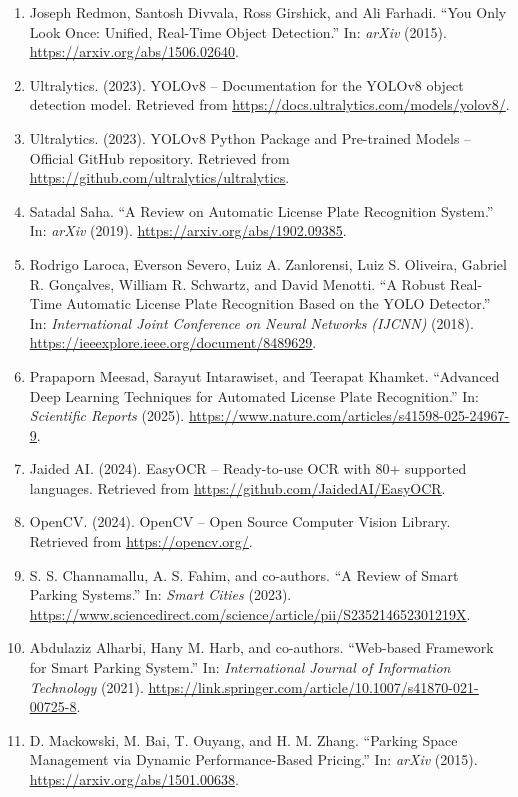 \documentclass[12pt,a4paper,oneside]{report}
\renewcommand{\url}[1]{\href{#1}{\textcolor{linkblue}{\uline{#1}}}}
\begin{document}
\begin{enumerate}[leftmargin=1.9em,label=\arabic*.,labelsep=0.45em,itemsep=0.15em,topsep=0.1em,parsep=0pt,partopsep=0pt]
    \item Joseph Redmon, Santosh Divvala, Ross Girshick, and Ali Farhadi. ``You Only Look Once: Unified, Real-Time Object Detection.'' In: \emph{arXiv} (2015). \url{https://arxiv.org/abs/1506.02640}.
    \item Ultralytics. (2023). YOLOv8 -- Documentation for the YOLOv8 object detection model. Retrieved from \url{https://docs.ultralytics.com/models/yolov8/}.
    \item Ultralytics. (2023). YOLOv8 Python Package and Pre-trained Models -- Official GitHub repository. Retrieved from \url{https://github.com/ultralytics/ultralytics}.
    \item Satadal Saha. ``A Review on Automatic License Plate Recognition System.'' In: \emph{arXiv} (2019). \url{https://arxiv.org/abs/1902.09385}.
    \item Rodrigo Laroca, Everson Severo, Luiz A. Zanlorensi, Luiz S. Oliveira, Gabriel R. Gonçalves, William R. Schwartz, and David Menotti. ``A Robust Real-Time Automatic License Plate Recognition Based on the YOLO Detector.'' In: \emph{International Joint Conference on Neural Networks (IJCNN)} (2018). \url{https://ieeexplore.ieee.org/document/8489629}.
    \item Prapaporn Meesad, Sarayut Intarawiset, and Teerapat Khamket. ``Advanced Deep Learning Techniques for Automated License Plate Recognition.'' In: \emph{Scientific Reports} (2025). \url{https://www.nature.com/articles/s41598-025-24967-9}.
    \item Jaided AI. (2024). EasyOCR -- Ready-to-use OCR with 80+ supported languages. Retrieved from \url{https://github.com/JaidedAI/EasyOCR}.
    \item OpenCV. (2024). OpenCV -- Open Source Computer Vision Library. Retrieved from \url{https://opencv.org/}.
    \item S. S. Channamallu, A. S. Fahim, and co-authors. ``A Review of Smart Parking Systems.'' In: \emph{Smart Cities} (2023). \url{https://www.sciencedirect.com/science/article/pii/S235214652301219X}.
    \item Abdulaziz Alharbi, Hany M. Harb, and co-authors. ``Web-based Framework for Smart Parking System.'' In: \emph{International Journal of Information Technology} (2021). \url{https://link.springer.com/article/10.1007/s41870-021-00725-8}.
    \item D. Mackowski, M. Bai, T. Ouyang, and H. M. Zhang. ``Parking Space Management via Dynamic Performance-Based Pricing.'' In: \emph{arXiv} (2015). \url{https://arxiv.org/abs/1501.00638}.

\end{enumerate}
\end{document}
